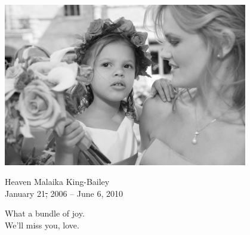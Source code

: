 \begin{dedications}
\begin{center}
  \includegraphics[width=0.8\textwidth]{blurb/hayley_and_heaven}
  \vspace{2\baselineskip}

  Heaven Malaika King-Bailey \\
  January 21\st, 2006 -- June 6\sth, 2010
  \vspace{2\baselineskip}

  What a bundle of joy. \\
  We'll miss you, love.
\end{center}
\end{dedications}
